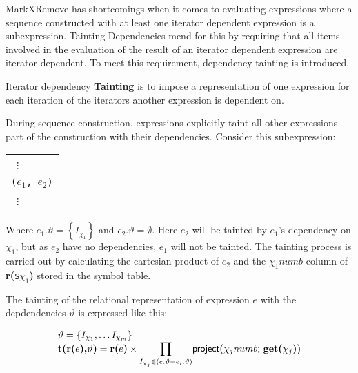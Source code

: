MarkXRemove has shortcomings when it comes to evaluating expressions where a
sequence constructed with at least one iterator dependent expression is a subexpression. Tainting Dependencies
mend for this by requiring that all items involved in the evaluation of the result of an iterator dependent
expression are iterator dependent. To meet this requirement, dependency tainting is introduced.

\noindent
\begin{myDefinition}
Iterator dependency \textbf{Tainting} is to impose a representation of one expression for each iteration of the
iterators another expression is dependent on.
\end{myDefinition}

During sequence construction, expressions explicitly taint all other expressions part of the construction with
their dependencies. Consider this subexpression:
\begin{center}
\begin{tabular}{l}
\quad \;\, $\vdots$  \\
\texttt{(}$e_{1}$\texttt{, }$e_{2}$\texttt{)}\\
\quad \;\, $\vdots$  
\end{tabular}
\end{center}
Where $e_{1}.\vartheta = \left\{I_{\chi_{1}}\right\}$ and $e_{2}.\vartheta = \emptyset$. Here $e_{2}$ will be
tainted by $e_{1}$'s dependency on $\chi_{1}$, but as $e_{2}$ have no dependencies, $e_{1}$ will not be tainted. The
tainting process is carried out by calculating the cartesian product of $e_{2}$ and the $\chi_{1}$$numb$ column of
\textbf{r(}\texttt{\$}$\chi_{1}$\textbf{)} stored in the symbol table.

The tainting of the relational representation of expression $e$ with the depdendencies $\vartheta$ is expressed
like this:
\begin{center}
\begin{equation}
\begin{array}{l}
\vartheta = \left\{I_{\chi_{1}},\ldots I_{\chi_{m}}\right\} \\
\mbox{\textbf{t(r(}}e\mbox{\textbf{),}}\vartheta\mbox{\textbf{)}} = 
\mbox{\textbf{r(}}e\mbox{\textbf{)}} \times {\displaystyle \prod_{I_{\chi_{j}} \in (e.\vartheta -
e_{i}.\vartheta)}} \mbox{\textsf{project(}}\chi_{j}numb\mbox{\textsf{;
}\textbf{get(}}\chi_{j}\mbox{\textbf{)}\textsf{)}}
\end{array}
\label{eq:trans:TD:taint}
\end{equation}
\end{center}

